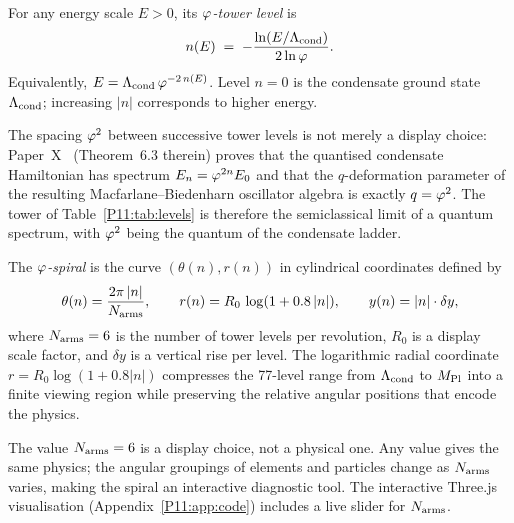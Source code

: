 

\begin{definition}
\label{P11:def:tower_level}
For any energy scale $E > 0$, its \emph{$\vp$-tower level} is
\begin{equation}
  n\!\left(E\right) \;=\; -\frac{\ln(E/\Lambda_{\mathrm{cond}})}{2\ln\varphi}.
  \label{P11:eq:tower_level}
\end{equation}
Equivalently, $E = \Lambda_{\mathrm{cond}}\,\varphi^{-2\,n(E)}$.
Level $n=0$ is the condensate ground state $\Lambda_{\mathrm{cond}}$;
increasing $|n|$ corresponds to higher energy.
\end{definition}

\begin{remark}
\label{P11:rem:quantum_tower_origin}
The spacing $\varphi^2$ between successive tower levels is not merely a
display choice: Paper~X~\cite{Paper10} (Theorem~6.3 therein) proves that
the quantised condensate Hamiltonian has spectrum $E_n = \varphi^{2n}E_0$
and that the $q$-deformation parameter of the resulting Macfarlane--Biedenharn
oscillator algebra is exactly $q = \varphi^2$.
The tower of Table~\ref{P11:tab:levels} is therefore the semiclassical limit
of a quantum spectrum, with $\varphi^2$ being the quantum of the condensate ladder.
\end{remark}

\begin{definition}[$\vp$-spiral]
\label{P11:def:spiral}
The \emph{$\vp$-spiral} is the curve
$(\theta(n), r(n))$ in cylindrical coordinates defined by
\begin{equation}
  \theta(n) = \frac{2\pi\,|n|}{N_{\rm arms}},
  \qquad
  r(n) = R_0\,\log(1 + 0.8\,|n|),
  \qquad
  y(n) = |n|\cdot\delta y,
  \label{P11:eq:spiral}
\end{equation}
where $N_{\rm arms} = 6$ is the number of tower levels per revolution,
$R_0$ is a display scale factor, and $\delta y$ is a vertical rise per
level.
The logarithmic radial coordinate $r = R_0\log(1+0.8|n|)$ compresses
the 77-level range from $\Lambda_{\mathrm{cond}}$ to $M_{\mathrm{Pl}}$ into a finite viewing
region while preserving the relative angular positions that encode
the physics.
\end{definition}

\begin{remark}
\label{P11:rem:Narms_choice}
The value $N_{\rm arms} = 6$ is a display choice, not a physical one.
Any value gives the same physics; the angular groupings of elements
and particles change as $N_{\rm arms}$ varies, making the spiral an
interactive diagnostic tool.  The interactive Three.js visualisation
(Appendix~\ref{P11:app:code}) includes a live slider for $N_{\rm arms}$.
\end{remark}


